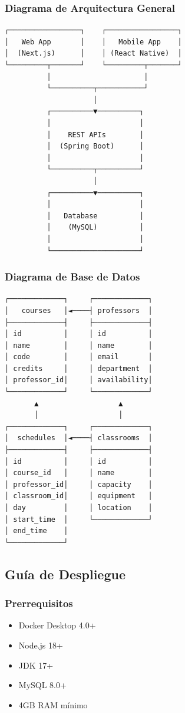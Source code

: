 \subsubsection{Diagrama de Arquitectura General}
\begin{verbatim}
┌─────────────────┐    ┌─────────────────┐
│   Web App       │    │   Mobile App    │
│  (Next.js)      │    │ (React Native)  │
└─────────┬───────┘    └─────────┬───────┘
          │                      │
          └──────────┬───────────┘
                     │
          ┌──────────▼──────────┐
          │                     │
          │    REST APIs        │
          │  (Spring Boot)      │
          │                     │
          └──────────┬──────────┘
                     │
          ┌──────────▼──────────┐
          │                     │
          │   Database          │
          │    (MySQL)          │
          │                     │
          └─────────────────────┘
\end{verbatim}

\subsubsection{Diagrama de Base de Datos}
\begin{verbatim}
┌─────────────┐     ┌─────────────┐
│   courses   │◄────┤ professors  │
├─────────────┤     ├─────────────┤
│ id          │     │ id          │
│ name        │     │ name        │
│ code        │     │ email       │
│ credits     │     │ department  │
│ professor_id│     │ availability│
└─────────────┘     └─────────────┘
       ▲                   ▲
       │                   │
┌─────────────┐     ┌─────────────┐
│  schedules  │◄────┤ classrooms  │
├─────────────┤     ├─────────────┤
│ id          │     │ id          │
│ course_id   │     │ name        │
│ professor_id│     │ capacity    │
│ classroom_id│     │ equipment   │
│ day         │     │ location    │
│ start_time  │     └─────────────┘
│ end_time    │
└─────────────┘
\end{verbatim}

\subsection{Guía de Despliegue}

\subsubsection{Prerrequisitos}
\begin{itemize}
\item Docker Desktop 4.0+
\item Node.js 18+
\item JDK 17+
\item MySQL 8.0+
\item 4GB RAM mínimo
\end{itemize}

